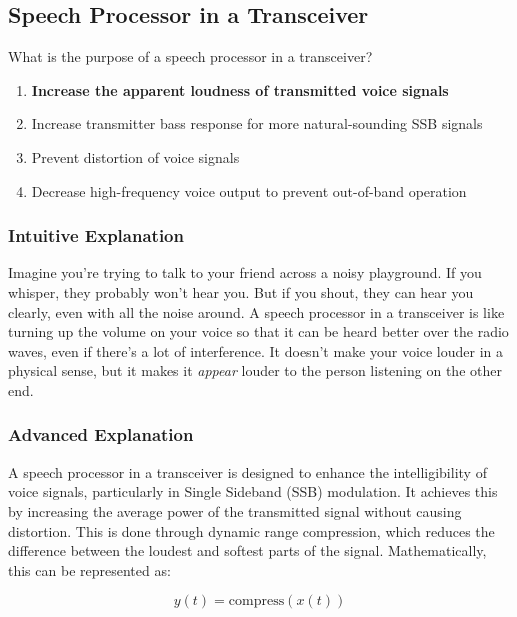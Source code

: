 \subsection{Speech Processor in a Transceiver}
\label{G4D01}

\begin{tcolorbox}[colback=gray!10!white,colframe=black!75!black,title=G4D01]
What is the purpose of a speech processor in a transceiver?
\begin{enumerate}[label=\Alph*),noitemsep]
    \item \textbf{Increase the apparent loudness of transmitted voice signals}
    \item Increase transmitter bass response for more natural-sounding SSB signals
    \item Prevent distortion of voice signals
    \item Decrease high-frequency voice output to prevent out-of-band operation
\end{enumerate}
\end{tcolorbox}

\subsubsection{Intuitive Explanation}
Imagine you're trying to talk to your friend across a noisy playground. If you whisper, they probably won't hear you. But if you shout, they can hear you clearly, even with all the noise around. A speech processor in a transceiver is like turning up the volume on your voice so that it can be heard better over the radio waves, even if there's a lot of interference. It doesn't make your voice louder in a physical sense, but it makes it \textit{appear} louder to the person listening on the other end.

\subsubsection{Advanced Explanation}
A speech processor in a transceiver is designed to enhance the intelligibility of voice signals, particularly in Single Sideband (SSB) modulation. It achieves this by increasing the average power of the transmitted signal without causing distortion. This is done through dynamic range compression, which reduces the difference between the loudest and softest parts of the signal. Mathematically, this can be represented as:

\[
y(t) = \text{compress}(x(t))
\]

